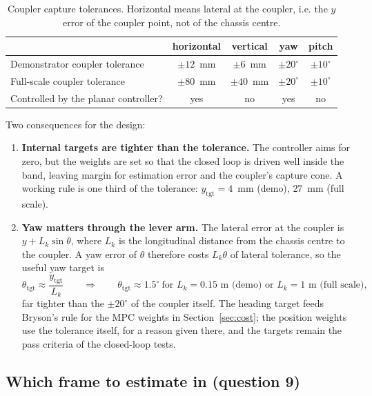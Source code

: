 \documentclass[11pt,a4paper]{article}
\begin{document}
\begin{table}[H]
\centering
\begin{tabular}{lcccc}
\toprule
 & horizontal & vertical & yaw & pitch \\
\midrule
Demonstrator coupler tolerance & $\pm 12$~mm & $\pm 6$~mm & $\pm 20^\circ$ & $\pm 10^\circ$ \\
Full-scale coupler tolerance   & $\pm 80$~mm & $\pm 40$~mm & $\pm 20^\circ$ & $\pm 10^\circ$ \\
Controlled by the planar controller? & yes & no & yes & no \\
\bottomrule
\end{tabular}
\caption{Coupler capture tolerances. Horizontal means lateral at the coupler, i.e. the $y$ error of the coupler point, not of the chassis centre.}
\end{table}

Two consequences for the design:
\begin{enumerate}[nosep]
  \item \textbf{Internal targets are tighter than the tolerance.} The controller aims for zero, but the weights are set so that the closed loop is driven well inside the band, leaving margin for estimation error and the coupler's capture cone. A working rule is one third of the tolerance: $y_{\mathrm{tgt}} = 4$~mm (demo), $27$~mm (full scale).
  \item \textbf{Yaw matters through the lever arm.} The lateral error at the coupler is $y + L_k\sin\theta$, where $L_k$ is the longitudinal distance from the chassis centre to the coupler. A yaw error of $\theta$ therefore costs $L_k\theta$ of lateral tolerance, so the useful yaw target is
  \begin{equation}
    \theta_{\mathrm{tgt}} \approx \frac{y_{\mathrm{tgt}}}{L_k}
    \qquad\Rightarrow\qquad
    \theta_{\mathrm{tgt}} \approx 1.5^\circ \ \text{for } L_k=0.15\text{ m (demo) or } L_k = 1\text{ m (full scale)},
  \end{equation}
  far tighter than the $\pm 20^\circ$ of the coupler itself. The heading target feeds Bryson's rule for the MPC weights in Section~\ref{sec:cost}; the position weights use the tolerance itself, for a reason given there, and the targets remain the pass criteria of the closed-loop tests.
\end{enumerate}

\subsection{Which frame to estimate in (question 9)}
\label{sec:frame}
\end{document}
